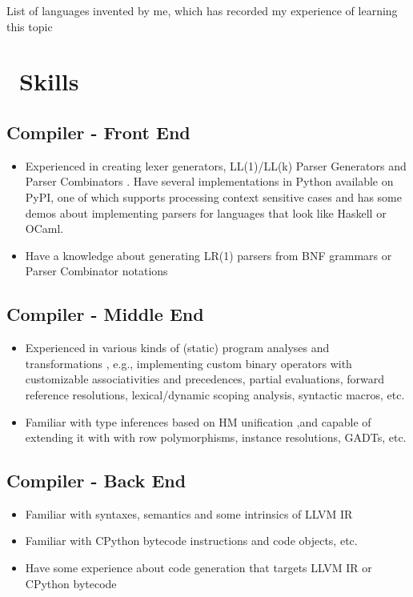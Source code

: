 \documentclass{resume}
\begin{document}
List of languages invented by me, which has recorded my experience of learning this topic


\section{\faCogs\ Skills}

\subsection{\textbf{Compiler - Front End}}
\begin{itemize}
  \item Experienced in creating lexer generators, LL(1)/LL(k) Parser Generators and Parser Combinators
        . Have several implementations in Python available on PyPI, one of which supports
        processing context sensitive cases and has some demos about implementing parsers
        for languages that look like Haskell or OCaml.
  \item Have a knowledge about generating LR(1) parsers from BNF grammars or Parser Combinator notations
\end{itemize}

\subsection{\textbf{Compiler - Middle End}}
\begin{itemize}
  \item Experienced in various kinds of (static) program analyses and transformations
        , e.g., 
          implementing custom binary operators with customizable associativities and precedences,
          partial evaluations, forward reference resolutions, lexical/dynamic scoping analysis, syntactic macros, etc.   
  \item Familiar with type inferences based on HM unification
      ,and capable of extending it with
       with row polymorphisms, instance resolutions, GADTs, etc.
\end{itemize}

\subsection{\textbf{Compiler - Back End}}
\begin{itemize}
  \item Familiar with syntaxes, semantics and some intrinsics of LLVM IR
  \item Familiar with CPython bytecode instructions and code objects, etc.
  \item Have some experience about code generation that targets LLVM IR or CPython bytecode
\end{itemize}
\end{document}
